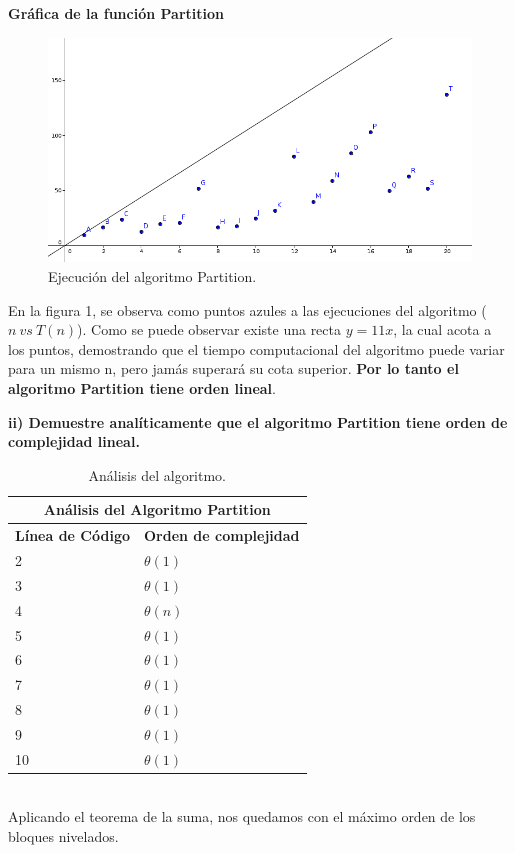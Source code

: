 \documentclass[12pt]{report}
\begin{document}
	\textbf{Gráfica de la función Partition\\}
	\begin{figure}[H]
		\includegraphics[width=15cm]{imagenes/1.png}
		\centering
		\caption{Ejecución del algoritmo Partition.}
		\centering
	\end{figure}
	En la figura 1, se observa como puntos azules a las ejecuciones del algoritmo ($n \ vs \ T(n)$). Como se puede observar existe una recta $y=11x$, la cual acota a los puntos, demostrando que el tiempo computacional del algoritmo puede variar para un mismo n, pero jamás superará su cota superior. \textbf{Por lo tanto el algoritmo Partition tiene orden lineal}.\newpage
	
	\textbf{ii) Demuestre analíticamente que el algoritmo Partition tiene orden de complejidad lineal.}\newline
	\begin{table}[htbp]
		\begin{center}
			\begin{tabular}{|l|l|}
				\hline
				\multicolumn{2}{|c|}{Análisis del Algoritmo Partition} \\ 
				\hline
				\textbf{Línea de Código} & \textbf{Orden de complejidad}\\
				\hline
				2 & $\theta (1)$ \\ \hline
				3 & $\theta (1)$ \\ \hline
				4 & $\theta (n)$ \\ \hline
				5 & $\theta (1)$ \\ \hline
				6 & $\theta (1)$ \\ \hline
				7 & $\theta (1)$ \\ \hline
				8 & $\theta (1)$ \\ \hline
				9 & $\theta (1)$ \\ \hline
				10 & $\theta (1)$ \\ \hline
			\end{tabular}
			\caption{Análisis del algoritmo.}
			\label{tabla:analisis}
		\end{center}
	\end{table}\\
	Aplicando el teorema de la suma, nos quedamos con el máximo orden de los bloques nivelados.\\ 
	
\end{document}
